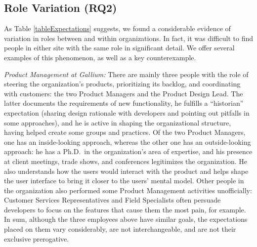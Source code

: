 \documentclass[10pt, conference, compsocconf]{IEEEtran}
\begin{document}


\subsection{Role Variation (RQ2)}

As Table \ref{tableExpectations} suggests, we found a considerable evidence of variation in roles between and within organizations. In fact, it was difficult to find people in either site with the same role in significant detail. We offer several examples of this phenomenon, as well as a key counterexample.

\emph{Product Management at Gallium:} There are mainly three people with the role of steering the organization's products, prioritizing its backlog, and coordinating with customers: the two Product Managers and the Product Design Lead. The latter documents the requirements of new functionality, he fulfills a ``historian'' expectation (sharing design rationale with developers and pointing out pitfalls in some approaches), and he is active in shaping the organizational structure, having helped create some groups and practices. Of the two Product Managers, one has an inside-looking approach, whereas the other one has an outside-looking approach: he has a Ph.D.\ in the organization's area of expertise, and his presence at client meetings, trade shows, and conferences legitimizes the organization. He also understands how the users would interact with the product and helps shape the user interface to bring it closer to the users' mental model. Other people in the organization also performed some Product Management activities unofficially: Customer Services Representatives and Field Specialists often persuade developers to focus on the features that cause them the most pain, for example. In sum, although the three employees above have similar goals, the expectations placed on them vary considerably, are not interchangeable, and are not their exclusive prerogative.
\end{document}
